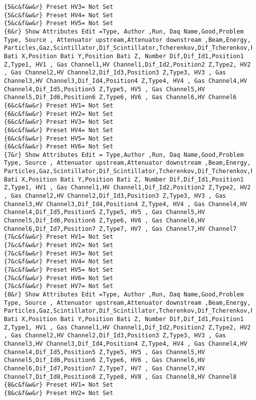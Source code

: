 {\begin{lstlisting}[breaklines=true,basicstyle=\tiny,postbreak=\mbox{\textcolor{red}{$\hookrightarrow$}\space},]
{5&c&f&w&r} Preset HV3= Not Set
{5&c&f&w&r} Preset HV4= Not Set
{5&c&f&w&r} Preset HV5= Not Set
{6&r} Show Attributes Edit =Type, Author ,Run, Daq Name,Good,Problem Type, Source , Attenuator upstream,Attenuator downstream ,Beam,Energy, Particles,Gaz,Scintillator,Dif_Scintillator,Tcherenkov,Dif_Tcherenkov,Position Bati X,Position Bati Y,Position Bati Z, Number Dif,Dif_Id1,Position1 Z,Type1, HV1 , Gas Channel1,HV Channel1,Dif_Id2,Position2 Z,Type2, HV2 , Gas Channel2,HV Channel2,Dif_Id3,Position3 Z,Type3, HV3 , Gas Channel3,HV Channel3,Dif_Id4,Position4 Z,Type4, HV4 , Gas Channel4,HV Channel4,Dif_Id5,Position5 Z,Type5, HV5 , Gas Channel5,HV Channel5,Dif_Id6,Position6 Z,Type6, HV6 , Gas Channel6,HV Channel6
{6&c&f&w&r} Preset HV1= Not Set
{6&c&f&w&r} Preset HV2= Not Set
{6&c&f&w&r} Preset HV3= Not Set
{6&c&f&w&r} Preset HV4= Not Set
{6&c&f&w&r} Preset HV5= Not Set
{6&c&f&w&r} Preset HV6= Not Set
{7&r} Show Attributes Edit = Type,Author ,Run, Daq Name,Good,Problem Type, Source , Attenuator upstream,Attenuator downstream ,Beam,Energy, Particles,Gaz,Scintillator,Dif_Scintillator,Tcherenkov,Dif_Tcherenkov,Position Bati X,Position Bati Y,Position Bati Z, Number Dif,Dif_Id1,Position1 Z,Type1, HV1 , Gas Channel1,HV Channel1,Dif_Id2,Position2 Z,Type2, HV2 , Gas Channel2,HV Channel2,Dif_Id3,Position3 Z,Type3, HV3 , Gas Channel3,HV Channel3,Dif_Id4,Position4 Z,Type4, HV4 , Gas Channel4,HV Channel4,Dif_Id5,Position5 Z,Type5, HV5 , Gas Channel5,HV Channel5,Dif_Id6,Position6 Z,Type6, HV6 , Gas Channel6,HV Channel6,Dif_Id7,Position7 Z,Type7, HV7 , Gas Channel7,HV Channel7
{7&c&f&w&r} Preset HV1= Not Set
{7&c&f&w&r} Preset HV2= Not Set
{7&c&f&w&r} Preset HV3= Not Set
{7&c&f&w&r} Preset HV4= Not Set
{7&c&f&w&r} Preset HV5= Not Set
{7&c&f&w&r} Preset HV6= Not Set
{7&c&f&w&r} Preset HV7= Not Set
{8&r} Show Attributes Edit =Type, Author ,Run, Daq Name,Good,Problem Type, Source , Attenuator upstream,Attenuator downstream ,Beam,Energy, Particles,Gaz,Scintillator,Dif_Scintillator,Tcherenkov,Dif_Tcherenkov,Position Bati X,Position Bati Y,Position Bati Z, Number Dif,Dif_Id1,Position1 Z,Type1, HV1 , Gas Channel1,HV Channel1,Dif_Id2,Position2 Z,Type2, HV2 , Gas Channel2,HV Channel2,Dif_Id3,Position3 Z,Type3, HV3 , Gas Channel3,HV Channel3,Dif_Id4,Position4 Z,Type4, HV4 , Gas Channel4,HV Channel4,Dif_Id5,Position5 Z,Type5, HV5 , Gas Channel5,HV Channel5,Dif_Id6,Position6 Z,Type6, HV6 , Gas Channel6,HV Channel6,Dif_Id7,Position7 Z,Type7, HV7 , Gas Channel7,HV Channel7,Dif_Id8,Position8 Z,Type8, HV8 , Gas Channel8,HV Channel8
{8&c&f&w&r} Preset HV1= Not Set
{8&c&f&w&r} Preset HV2= Not Set

\end{lstlisting}}
